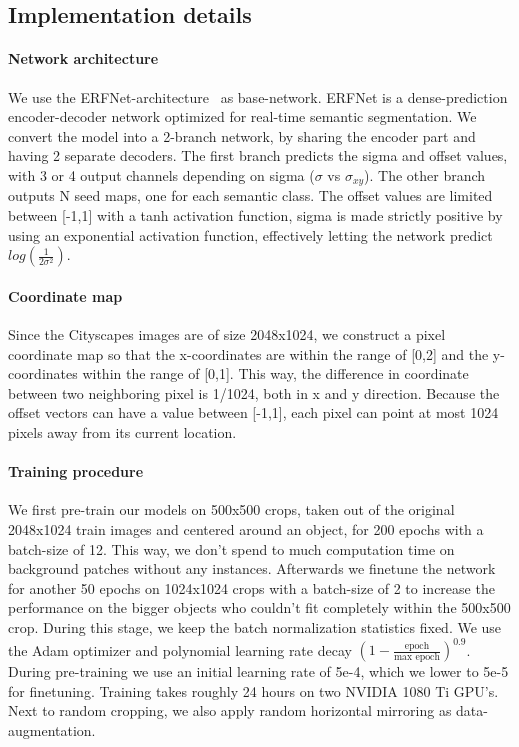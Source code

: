 \subsection{Implementation details}

\paragraph{Network architecture} We use the ERFNet-architecture~\cite{romera2018erfnet} as base-network. ERFNet is a dense-prediction encoder-decoder network optimized for real-time semantic segmentation. We convert the model into a 2-branch network, by sharing the encoder part and having 2 separate decoders. The first branch predicts the sigma and offset values, with 3 or 4 output channels depending on sigma ($\sigma$ vs $\sigma_{xy}$). The other branch outputs N seed maps, one for each semantic class. The offset values are limited between [-1,1] with a tanh activation function, sigma is made strictly positive by using an exponential activation function, effectively letting the network predict $log(\frac{1}{2\sigma^2})$.

\paragraph{Coordinate map} Since the Cityscapes images are of size 2048x1024, we construct a pixel coordinate map so that the x-coordinates are within the range of [0,2] and the y-coordinates within the range of [0,1]. This way, the difference in coordinate between two neighboring pixel is 1/1024, both in x and y direction. Because the offset vectors can have a value between [-1,1], each pixel can point at most 1024 pixels away from its current location. 

\paragraph{Training procedure} We first pre-train our models on 500x500 crops, taken out of the original 2048x1024 train images and centered around an object, for 200 epochs with a batch-size of 12. This way, we don't spend to much computation time on background patches without any instances. Afterwards we finetune the network for another 50 epochs on 1024x1024 crops with a batch-size of 2 to increase the performance on the bigger objects who couldn't fit completely within the 500x500 crop. During this stage, we keep the batch normalization statistics fixed. We use the Adam optimizer and polynomial learning rate decay $(1 - \frac{\text{epoch}}{\text{max epoch}})^{0.9}$. During pre-training we use an initial learning rate of 5e-4, which we lower to 5e-5 for finetuning. Training takes roughly 24 hours on two NVIDIA 1080 Ti GPU's. Next to random cropping, we also apply random horizontal mirroring as data-augmentation.

